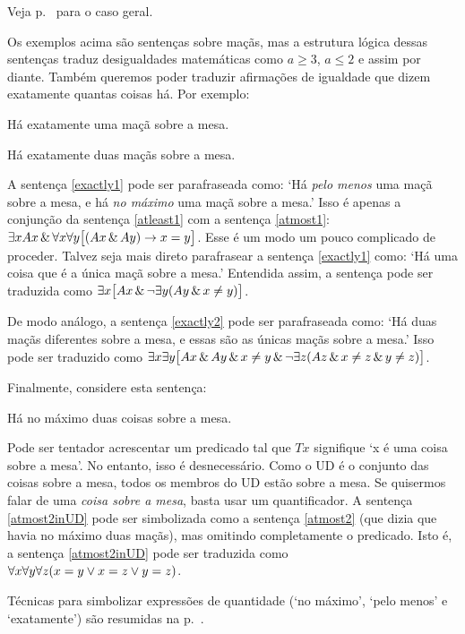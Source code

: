 Veja p.~\pageref{summary.atmost} para o caso geral.

Os exemplos acima são sentenças sobre maçãs, mas a estrutura lógica dessas sentenças traduz desigualdades matemáticas como $a\geq 3$, $a \leq 2$ e assim por diante. Também queremos poder traduzir afirmações de igualdade que dizem exatamente quantas coisas há. Por exemplo:
\begin{earg}
\item[\ex{exactly1}] Há exatamente uma maçã sobre a mesa.
\item[\ex{exactly2}] Há exatamente duas maçãs sobre a mesa.
\end{earg}

A sentença \ref{exactly1} pode ser parafraseada como: `Há \emph{pelo menos} uma maçã sobre a mesa, e há \emph{no máximo} uma maçã sobre a mesa.' Isso é apenas a conjunção da sentença \ref{atleast1} com a sentença \ref{atmost1}: $\exists x Ax \,\&\, \forall x\forall y\bigl[(Ax \,\&\, Ay) \rightarrow x=y\bigr]$. Esse é um modo um pouco complicado de proceder. Talvez seja mais direto parafrasear a sentença \ref{exactly1} como: `Há uma coisa que é a única maçã sobre a mesa.' Entendida assim, a sentença pode ser traduzida como $\exists x\bigl[Ax \,\&\, \neg\exists y(Ay \,\&\, x\neq y)\bigr]$.

De modo análogo, a sentença \ref{exactly2} pode ser parafraseada como: `Há duas maçãs diferentes sobre a mesa, e essas são as únicas maçãs sobre a mesa.' Isso pode ser traduzido como $\exists x\exists y\bigl[Ax \,\&\, Ay \,\&\, x\neq y \,\&\, \neg\exists z(Az \,\&\, x\neq z \,\&\, y\neq z)\bigr]$.

Finalmente, considere esta sentença:
\begin{earg}
\item[\ex{atmost2inUD}] Há no máximo duas coisas sobre a mesa.
\end{earg}
Pode ser tentador acrescentar um predicado tal que $Tx$ signifique `x é uma coisa sobre a mesa'. No entanto, isso é desnecessário. Como o UD é o conjunto das coisas sobre a mesa, todos os membros do UD estão sobre a mesa. Se quisermos falar de uma \emph{coisa sobre a mesa}, basta usar um quantificador. A sentença \ref{atmost2inUD} pode ser simbolizada como a sentença \ref{atmost2} (que dizia que havia no máximo duas maçãs), mas omitindo completamente o predicado. Isto é, a sentença \ref{atmost2inUD} pode ser traduzida como $\forall x \forall y \forall z(x=y \vee x=z \vee y=z)$.

Técnicas para simbolizar expressões de quantidade (`no máximo', `pelo menos' e `exatamente') são resumidas na p.~\pageref{summary.atleast}.


